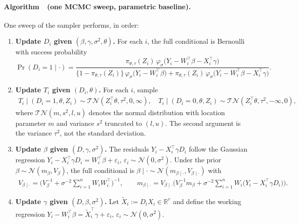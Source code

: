 \documentclass[11pt]{article}
\theoremstyle{definition}
\theoremstyle{plain}
\newcommand{\R}{\mathbb{R}}
\begin{document}
\providecommand{\theHalgsweep}{\arabic{algsweep}}
\label{alg:gibbs}%
\paragraph{Algorithm~\thealgsweep\ (one MCMC sweep, parametric baseline).}
One sweep of the sampler performs, in order:
\begin{enumerate}[leftmargin=*,nosep]
\item \textbf{Update $D_i$ given $(\beta,\gamma,\sigma^2,\theta)$.}
For each $i$, the full conditional is Bernoulli with success probability
\begin{equation*}
\Pr(D_i=1\mid\cdot)=
\frac{\pi_{\theta,\tau}(Z_i)\,\varphi_\sigma\!\big(Y_i-W_i^\top\beta-X_i^\top\gamma\big)}
{\{1-\pi_{\theta,\tau}(Z_i)\}\,\varphi_\sigma\!\big(Y_i-W_i^\top\beta\big)+\pi_{\theta,\tau}(Z_i)\,\varphi_\sigma\!\big(Y_i-W_i^\top\beta-X_i^\top\gamma\big)}.
\end{equation*}
\item \textbf{Update $T_i$ given $(D_i,\theta)$.}
For each $i$, sample
\begin{align*}
    T_i\mid(D_i=1,\theta,Z_i)\sim\mathcal{TN}(Z_i^\top\theta,\tau^2,0,\infty), \quad
    T_i\mid(D_i=0,\theta,Z_i)\sim\mathcal{TN}(Z_i^\top\theta,\tau^2,-\infty,0),
\end{align*}
where $\mathcal{TN}(m,s^2,l,u)$ denotes the normal distribution with location parameter $m$ and variance $s^2$ truncated to $(l,u)$. The second argument is the variance $\tau^2$, not the standard deviation.
\item \textbf{Update $\beta$ given $(D,\gamma,\sigma^2)$.}
The residuals $Y_i-X_i^\top\gamma D_i$ follow the Gaussian regression $Y_i-X_i^\top\gamma D_i=W_i^\top\beta+\varepsilon_i$, $\varepsilon_i\sim\mathcal N(0,\sigma^2)$. Under the prior $\beta\sim\mathcal N(m_\beta,V_\beta)$, the full conditional is $\beta\mid\cdot\sim\mathcal N(m_{\beta\mid\cdot},V_{\beta\mid\cdot})$ with
\begin{align*}
    V_{\beta\mid\cdot}=\Big(V_\beta^{-1}+\sigma^{-2}\sum_{i=1}^n W_iW_i^\top\Big)^{-1},\qquad
    m_{\beta\mid\cdot}=V_{\beta\mid\cdot}\Big(V_\beta^{-1}m_\beta+\sigma^{-2}\sum_{i=1}^n W_i\big(Y_i-X_i^\top\gamma D_i\big)\Big).
\end{align*}
\item \textbf{Update $\gamma$ given $(D,\beta,\sigma^2)$.}
Let $\widetilde X_i:=D_iX_i\in\R^r$ and define the working regression $Y_i-W_i^\top\beta=\widetilde X_i^\top\gamma+\varepsilon_i$, $\varepsilon_i\sim\mathcal N(0,\sigma^2)$.

\end{enumerate}
\end{document}
